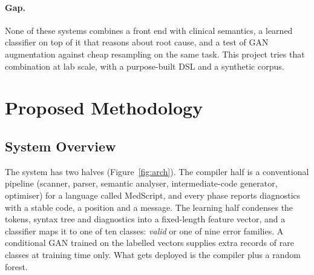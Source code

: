 \documentclass[12pt,a4paper]{article}
\begin{document}
\paragraph{Gap.} None of these systems combines a front end with clinical semantics, a learned classifier on top of it
that reasons about root cause, and a test of GAN augmentation against cheap resampling on the same task. This project
tries that combination at lab scale, with a purpose-built DSL and a synthetic corpus.

\section{Proposed Methodology}

\subsection{System Overview}

The system has two halves (Figure~\ref{fig:arch}). The compiler half is a conventional pipeline (scanner, parser,
semantic analyser, intermediate-code generator, optimiser) for a language called MedScript, and every phase reports
diagnostics with a stable code, a position and a message. The learning half condenses the tokens, syntax tree and
diagnostics into a fixed-length feature vector, and a classifier maps it to one of ten classes: \emph{valid} or one of
nine error families. A conditional GAN trained on the labelled vectors supplies extra records of rare classes at
training time only. What gets deployed is the compiler plus a random forest.
\end{document}
